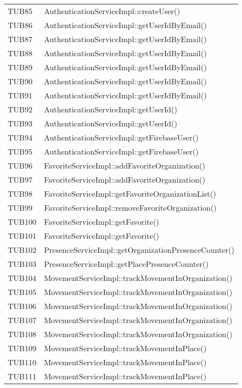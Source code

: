 {\begin{longtable}{C{2cm} C{12cm}}
		TUB85 & AuthenticationServiceImpl::createUser()\\
		TUB86 & AuthenticationServiceImpl::getUserIdByEmail()\\
		TUB87 & AuthenticationServiceImpl::getUserIdByEmail()\\
		TUB88 & AuthenticationServiceImpl::getUserIdByEmail()\\
		TUB89 & AuthenticationServiceImpl::getUserIdByEmail()\\
		TUB90 & AuthenticationServiceImpl::getUserIdByEmail()\\
		TUB91 & AuthenticationServiceImpl::getUserIdByEmail()\\
		TUB92 & AuthenticationServiceImpl::getUserId()\\
		TUB93 & AuthenticationServiceImpl::getUserId()\\
		TUB94 & AuthenticationServiceImpl::getFirebaseUser()\\
		TUB95 & AuthenticationServiceImpl::getFirebaseUser()\\
		TUB96 & FavoriteServiceImpl::addFavoriteOrganization()\\
		TUB97 & FavoriteServiceImpl::addFavoriteOrganization()\\
		TUB98 & FavoriteServiceImpl::getFavoriteOrganizationList()\\
		TUB99 & FavoriteServiceImpl::removeFavoriteOrganization()\\
		TUB100 & FavoriteServiceImpl::getFavorite()\\
		TUB101 & FavoriteServiceImpl::getFavorite()\\
		TUB102 & PresenceServiceImpl::getOrganizationPresenceCounter()\\
		TUB103 & PresenceServiceImpl::getPlacePresenceCounter()\\
		TUB104 & MovementServiceImpl::trackMovementInOrganization()\\
		TUB105 & MovementServiceImpl::trackMovementInOrganization()\\
		TUB106 & MovementServiceImpl::trackMovementInOrganization()\\
		TUB107 & MovementServiceImpl::trackMovementInOrganization()\\
		TUB108 & MovementServiceImpl::trackMovementInOrganization()\\
		TUB109 & MovementServiceImpl::trackMovementInPlace()\\
		TUB110 & MovementServiceImpl::trackMovementInPlace()\\
		TUB111 & MovementServiceImpl::trackMovementInPlace()\\

\end{longtable}}
